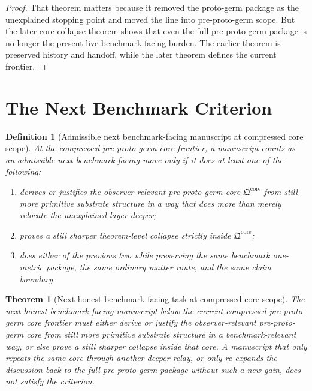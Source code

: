 \documentclass[11pt]{article}
\newcommand{\PreProtoCore}{\mathfrak Q^{\mathrm{core}}}
\newtheorem{definition}{Definition}
\newtheorem{theorem}{Theorem}
\begin{document}
\begin{proof}
That theorem matters because it removed the proto-germ package as the unexplained stopping point and moved the line into pre-proto-germ scope. But the later core-collapse theorem shows that even the full pre-proto-germ package is no longer the present live benchmark-facing burden. The earlier theorem is preserved history and handoff, while the later theorem defines the current frontier.
\end{proof}

\section{The Next Benchmark Criterion}

\begin{definition}[Admissible next benchmark-facing manuscript at compressed core scope]
At the compressed pre-proto-germ core frontier, a manuscript counts as an admissible next benchmark-facing move only if it does at least one of the following:
\begin{enumerate}
    \item derives or justifies the observer-relevant pre-proto-germ core \(\PreProtoCore\) from still more primitive substrate structure in a way that does more than merely relocate the unexplained layer deeper;
    \item proves a still sharper theorem-level collapse strictly inside \(\PreProtoCore\);
    \item does either of the previous two while preserving the same benchmark one-metric package, the same ordinary matter route, and the same claim boundary.
\end{enumerate}
\end{definition}

\begin{theorem}[Next honest benchmark-facing task at compressed core scope]
The next honest benchmark-facing manuscript below the current compressed pre-proto-germ core frontier must either derive or justify the observer-relevant pre-proto-germ core from still more primitive substrate structure in a benchmark-relevant way, or else prove a still sharper collapse inside that core. A manuscript that only repeats the same core through another deeper relay, or only re-expands the discussion back to the full pre-proto-germ package without such a new gain, does not satisfy the criterion.
\end{theorem}
\end{document}
